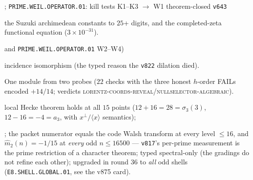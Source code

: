 ; \texttt{PRIME.WEIL.OPERATOR.01}: kill tests K1--K3
$\to$ W1 theorem-closed \texttt{v643}

the Suzuki archimedean
constants to $25$+ digits, and the completed-zeta functional equation
($3\times10^{-31}$).

 and
\texttt{PRIME.WEIL.OPERATOR.01} W2--W4)

incidence isomorphism (the typed reason the \texttt{v822}
dilation died).

One module from two probes ($22$ checks with the three honest
$h$-order FAILs encoded $+14/14$; verdicts
\textsc{lorentz-coords-reveal}/\textsc{nullselector-algebraic}).


local Hecke theorem holds at all $15$ points ($12 + 16 = 28 =
\sigma_3(3)$, $12 - 16 = -4 = a_3$, with $x^{\perp}/\langle
x\rangle$ semantics); 

; the packet numerator equals
the code Walsh transform at every level $\le 16$, and
$\hat m_2(n) = -1/15$ at \emph{every} odd $n \le 16500$ ---
\texttt{v817}'s per-prime measurement is the prime restriction
of a character theorem; typed spectral-only (the gradings do
not refine each other); upgraded in round 36 to \emph{all} odd
shells (\texttt{E8.SHELL.GLOBAL.01}, see the v875 card).
